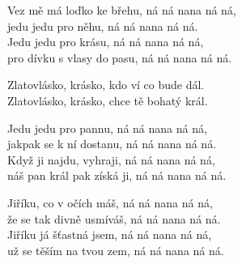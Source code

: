
\ve{}
Vez mě má loďko ke břehu, ná ná nana ná ná,\\
jedu jedu pro něhu, ná ná nana ná ná.\\
Jedu jedu pro krásu, ná ná nana ná ná,\\
pro dívku s vlasy do pasu, ná ná nana ná ná.

\cho{}
Zlatovlásko, krásko, kdo ví co bude dál.\\
Zlatovlásko, krásko, chce tě bohatý král.

\ve{}
Jedu jedu pro pannu, ná ná nana ná ná,\\
jakpak se k ní dostanu, ná ná nana ná ná.\\
Když ji najdu, vyhraji, ná ná nana ná ná,\\
náš pan král pak získá ji, ná ná nana ná ná.

\cho{}

Jiříku, co v očích máš, ná ná nana ná ná,\\
že se tak divně usmíváš, ná ná nana ná ná.\\
Jiříku já šťastná jsem, ná ná nana ná ná,\\
už se těším na tvou zem, ná ná nana ná ná.

\cho{}

\esong{}
